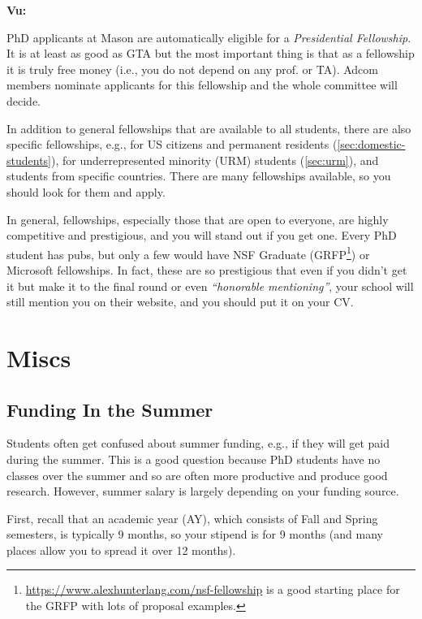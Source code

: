 \documentclass[oneside,11pt,dvipsnames]{book}
\newenvironment{commentbox}[1][]{
  \small
  \begin{mybox}
    {\small \textbf{#1}}
  }{
  \end{mybox}
}
\begin{document}
\begin{commentbox}[Vu:]
  PhD applicants at Mason are automatically eligible for a \emph{Presidential Fellowship}.  It is at least as good as GTA but the most important thing is that as a fellowship it is truly free money (i.e., you do not depend on any prof. or TA).  Adcom members nominate applicants for this fellowship and the whole committee will decide.
\end{commentbox}

In addition to general fellowships that are available to all students, there are also specific fellowships, e.g., for US citizens and permanent residents (\autoref{sec:domestic-students}), for underrepresented minority (URM) students (\autoref{sec:urm}), and students from specific countries. There are many fellowships available, so you should look for them and apply.

In general, fellowships, especially those that are open to everyone, are highly competitive and prestigious, and you will stand out if you get one.  Every PhD student has pubs, but only a few would have NSF Graduate (GRFP\footnote{\url{https://www.alexhunterlang.com/nsf-fellowship} is a good starting place for the GRFP with lots of proposal examples.}) or Microsoft fellowships. In fact, these are so prestigious that even if you didn't get it but make it to the final round or even \emph{``honorable mentioning''}, your school will still mention you on their website, and you should put it on your CV.

\section{Miscs}

\subsection{Funding In the Summer}\label{sec:summer-funding}

Students often get confused about summer funding, e.g., if they will get paid during the summer.  This is a good question because PhD students have no classes over the summer and so are often more productive and produce good research. However, summer salary is largely depending on your funding source.

First, recall that an academic year (AY), which consists of Fall and Spring semesters, is typically 9 months, so your stipend is for 9 months (and many places allow you to spread it over 12 months).
\end{document}
